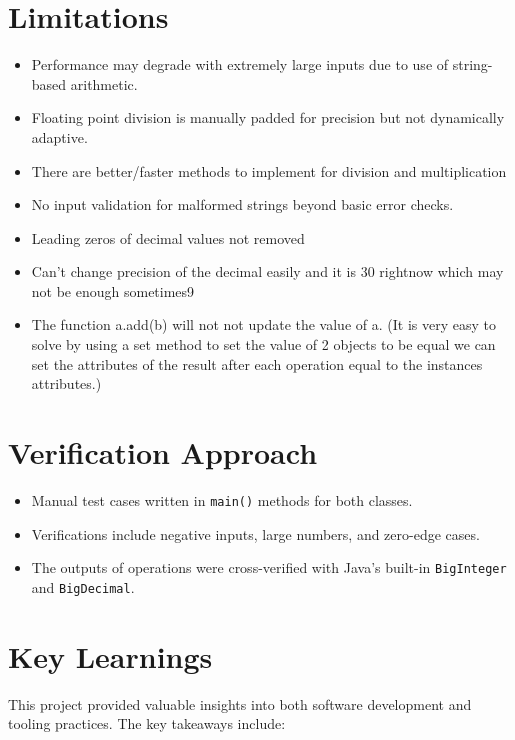 \documentclass[12pt]{article}
\begin{document}
\section{Limitations}
\begin{itemize}
    \item Performance may degrade with extremely large inputs due to use of string-based arithmetic.
    \item Floating point division is manually padded for precision but not dynamically adaptive.
    \item There are better/faster methods to implement for division and multiplication
    \item No input validation for malformed strings beyond basic error checks.
    \item Leading zeros of decimal values not removed
    \item Can't change precision of the decimal easily and it is 30 rightnow which may not be enough sometimes9
    \item The function a.add(b) will not not update the value of a. (It is very easy to solve by using a set method to set the value of 2 objects to be equal we can set the attributes of the result after each operation equal to the instances attributes.)
\end{itemize}

\section{Verification Approach}
\begin{itemize}
    \item Manual test cases written in \texttt{main()} methods for both classes.
    \item Verifications include negative inputs, large numbers, and zero-edge cases.
    \item The outputs of operations were cross-verified with Java’s built-in \texttt{BigInteger} and \texttt{BigDecimal}.
\end{itemize}

\section{Key Learnings}

This project provided valuable insights into both software development and tooling practices. The key takeaways include:
\end{document}
